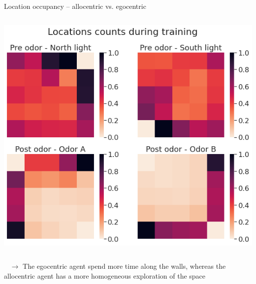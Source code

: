 \documentclass[bigger]{beamer}
\begin{document}
\begin{frame}[label={sec:org2c2a3a1}]{Location occupancy -- allocentric vs. egocentric}
\begin{columns}
\begin{column}{0.5\columnwidth}
\begin{center}
\includegraphics[width=.9\linewidth]{img/q-learning_ego_locations_count_all_steps_by_cues.png}
\end{center}
\end{column}
\end{columns}
\begin{block}{~}
\footnotesize
\vspace{-2em}
\(\to\) The egocentric agent spend more time along the walls, whereas the allocentric agent has a more homogeneous exploration of the space
\end{block}
\end{frame}
\end{document}
